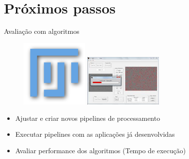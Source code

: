 \documentclass{beamer}
\begin{document}
  \section{Próximos passos}
  \begin{frame}{Avaliação com algoritmos}

    \begin{figure}
      \includegraphics[width=0.3\textwidth]{imgs/fiji.png}
      \includegraphics[width=0.35\textwidth]{imgs/bioed.jpeg}
    \end{figure}

    \vfill

    \begin{itemize}
    \item Ajustar e criar novos pipelines de processamento
    \item Executar pipelines com as aplicações já desenvolvidas
 \item Avaliar performance dos algoritmos (Tempo de execução)
    \end{itemize}

  \end{frame}
\end{document}
